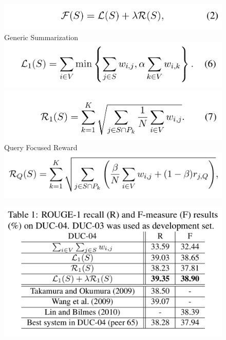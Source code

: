 \documentclass[xcolor={table}]{beamer}
\begin{document}
\begin{frame}[t]{\cite{lin2011class}}
      \begin{figure}[h]
      \includegraphics[scale=.2]{images/math2-lin11.png} \\
      Generic Summarization\\
      \includegraphics[scale=.2]{images/math6-lin11.png} \\
      \includegraphics[scale=.2]{images/math7-lin11.png} \\
      Query Focused Reward\\
      \includegraphics[scale=.2]{images/queryr-lin11.png} \\
  \end{figure}
\end{frame}

\begin{frame}[t]{\cite{lin2011class}}
      \begin{figure}[h]
      \includegraphics[scale=.26]{images/table1-lin11.png} \\
  \end{figure}
\end{frame}
\end{document}
